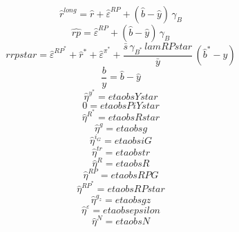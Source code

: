 \begin{dmath}
{\hat{r}^{long}}={\hat{r}}+{\hat{\varepsilon}^{RP}}+\left({\hat{b}}-{\hat{y}}\right)\, {\gamma_{B}}
\end{dmath}
\begin{dmath}
{\hat{rp}}={\hat{\varepsilon}^{RP}}+\left({\hat{b}}-{\hat{y}}\right)\, {\gamma_{B}}
\end{dmath}
\begin{dmath}
{rrpstar}={\hat{\varepsilon}^{RP^*}}+{\hat{r}^*}+{\hat{\varepsilon}^{\pi^*}}+\frac{{\bar{s}}\, {\gamma_{B^*}}\, {lamRPstar}}{{\bar{y}}}\, \left({\hat{b}^*}-{\hat{y}}\right)
\end{dmath}
\begin{dmath}
{\frac{b}{y}}={\hat{b}}-{\hat{y}}
\end{dmath}
\begin{dmath}
{\hat{\eta}^{y^*}}={etaobsYstar}
\end{dmath}
\begin{dmath}
0={etaobsPiYstar}
\end{dmath}
\begin{dmath}
{\hat{\eta}^{R^*}}={etaobsRstar}
\end{dmath}
\begin{dmath}
{\hat{\eta}^{g}}={etaobsg}
\end{dmath}
\begin{dmath}
{\hat{\eta}^{i_G}}={etaobsiG}
\end{dmath}
\begin{dmath}
{\hat{\eta}^{tr}}={etaobstr}
\end{dmath}
\begin{dmath}
{\hat{\eta}^{R}}={etaobsR}
\end{dmath}
\begin{dmath}
{\hat{\eta}^{RP}}={etaobsRPG}
\end{dmath}
\begin{dmath}
{\hat{\eta}^{RP^*}}={etaobsRPstar}
\end{dmath}
\begin{dmath}
{\hat{\eta}^{g_z}}={etaobsgz}
\end{dmath}
\begin{dmath}
{\hat{\eta}^{\varepsilon}}={etaobsepsilon}
\end{dmath}
\begin{dmath}
{\hat{\eta}^{N}}={etaobsN}
\end{dmath}
